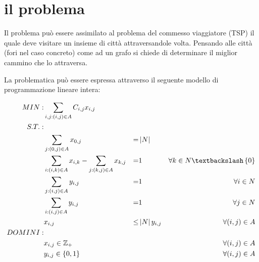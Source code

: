 %
%
\section[Il problema]{il problema}
\label{pt1:problem}
Il problema può essere assimilato al problema del commesso viaggiatore (TSP) il quale deve visitare un insieme di città attraversandole  volta. Pensando alle città (fori nel caso concreto) come ad un grafo si chiede di determinare il miglior cammino  che lo attraversa.

La problematica può essere espressa attraverso il seguente modello di programmazione lineare intera:

\begin{align}
MIN: &\sum_{i,j:(i,j) \in A} C_{i,j}x_{i,j} \\
S.T.: \nonumber \\ 
&\sum_{j:(0,j) \in A} x_{0,j} &=&\left|N\right|& \\
&\sum_{i:(i,k) \in A} x_{i,k} - \sum_{j:(k,j) \in A} x_{k,j} &=&1 &\forall k \in N \textbackslash \left\{0\right\} \\
&\sum_{j:(i,j) \in A} y_{i,j} &=&1 &\forall i \in N \\
&\sum_{i:(i,j) \in A} y_{i,j} &=&1 &\forall j \in N \\
&x_{i,j} &\le&\left|N\right|y_{i,j} &\forall (i,j) \in A\\
DOMINI: \nonumber \\ 
&x_{i,j} \in \mathbb{Z}_{+} &&& \forall (i,j) \in A\\
&y_{i,j} \in \left\{0, 1\right\} &&& \forall (i, j) \in A
\end{align}